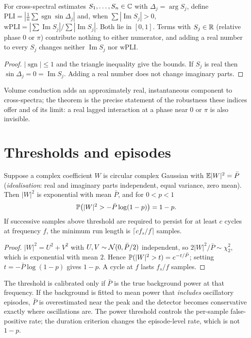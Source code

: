 \begin{theorem}\label{ars:circ-004}
For cross-spectral estimates $S_1,\dots,S_n\in\mathbb C$ with $\Delta_j=\arg S_j$, define $\mathrm{PLI}=|\frac1n\sum\operatorname{sgn}\sin\Delta_j|$ and, when $\sum|\operatorname{Im}S_j|>0$, $\mathrm{wPLI}=|\sum\operatorname{Im}S_j|/\sum|\operatorname{Im}S_j|$. Both lie in $[0,1]$. Terms with $S_j\in\mathbb R$ (relative phase $0$ or $\pi$) contribute nothing to either numerator, and adding a real number to every $S_j$ changes neither $\operatorname{Im}S_j$ nor $\mathrm{wPLI}$.
\end{theorem}
\begin{proof}
$|\operatorname{sgn}|\le1$ and the triangle inequality give the bounds. If $S_j$ is real then $\sin\Delta_j=0=\operatorname{Im}S_j$. Adding a real number does not change imaginary parts.
\end{proof}
Volume conduction adds an approximately real, instantaneous component to cross-spectra; the theorem is the precise statement of the robustness these indices offer and of its limit: a real lagged interaction at a phase near $0$ or $\pi$ is also invisible.

\section{Thresholds and episodes}
\begin{theorem}\label{ars:det-001}
Suppose a complex coefficient $W$ is circular complex Gaussian with $\mathbb E|W|^2=\bar P$ (\emph{idealisation}: real and imaginary parts independent, equal variance, zero mean). Then $|W|^2$ is exponential with mean $\bar P$, and for $0<p<1$
\[\mathbb P\bigl(|W|^2>-\bar P\log(1-p)\bigr)=1-p.\]
If successive samples above threshold are required to persist for at least $c$ cycles at frequency $f$, the minimum run length is $\lceil cf_s/f\rceil$ samples.
\end{theorem}
\begin{proof}
$|W|^2=U^2+V^2$ with $U,V\sim\mathcal{N}(0,\bar P/2)$ independent, so $2|W|^2/\bar P\sim\chi^2_2$, which is exponential with mean $2$. Hence $\mathbb P(|W|^2>t)=e^{-t/\bar P}$; setting $t=-\bar P\log(1-p)$ gives $1-p$. A cycle at $f$ lasts $f_s/f$ samples.
\end{proof}
The threshold is calibrated only if $\bar P$ is the true background power at that frequency. If the background is fitted to mean power that \emph{includes} oscillatory episodes, $\bar P$ is overestimated near the peak and the detector becomes conservative exactly where oscillations are. The power threshold controls the per-sample false-positive rate; the duration criterion changes the episode-level rate, which is not $1-p$.

